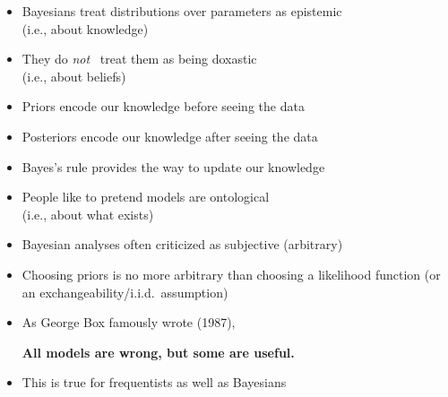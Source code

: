 \documentclass[10pt]{report}
\begin{document}
%
\begin{itemize}
\item Bayesians treat distributions over parameters as epistemic \\
(i.e., about knowledge)
\item They do \emph{not} \ treat them as being doxastic \\
(i.e., about beliefs)
\item Priors encode our knowledge before seeing the data
\item Posteriors encode our knowledge after seeing the data
\item Bayes's rule provides the way to update our knowledge
\item People like to pretend models are ontological \\
(i.e., about what exists)
\end{itemize}

%
\begin{itemize}
\item Bayesian analyses often criticized as subjective (arbitrary)
\item Choosing priors is no more arbitrary than choosing a likelihood
  function (or an exchangeability/i.i.d.\ assumption)
\item As George Box famously wrote (1987),
\begin{center}
\large
{\bfseries All models are wrong, but some are useful.}
\end{center}
\item This is true for frequentists as well as Bayesians
\end{itemize}


\end{document}

